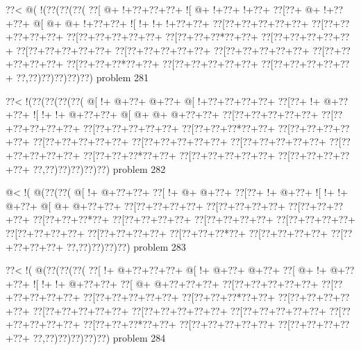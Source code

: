 \vbox{\vbox{\goo
\0??<\- @(\- !(\0??(\0??(\0??(
\0??[\- @+\- !+\0??+\0??+\0??+
\- ![\- @+\- !+\0??+\- !+\0??+
\0??[\0??+\- @+\- !+\0??+\0??+
\- @[\- @+\- @+\- !+\0??+\0??+
\- ![\- !+\- !+\- !+\0??+\0??+
\0??[\0??+\0??+\0??+\0??+\0??+
\0??[\0??+\0??+\0??+\0??+\0??+
\0??[\0??+\0??+\0??+\0??+\0??+
\0??[\0??+\0??+\0??*\0??+\0??+
\0??[\0??+\0??+\0??+\0??+\0??+
\0??[\0??+\0??+\0??+\0??+\0??+
\0??[\0??+\0??+\0??+\0??+\0??+
\0??[\0??+\0??+\0??+\0??+\0??+
\0??[\0??+\0??+\0??+\0??+\0??+
\0??[\0??+\0??+\0??*\0??+\0??+
\0??[\0??+\0??+\0??+\0??+\0??+
\0??[\0??+\0??+\0??+\0??+\0??+
\0??,\0??)\0??)\0??)\0??)\0??)
}
\hfil problem 281\hfil\break
}

\vbox{\vbox{\goo
\0??<\- !(\0??(\0??(\0??(\0??(
\- @[\- !+\- @+\0??+\- @+\0??+
\- @[\- !+\0??+\0??+\0??+\0??+
\0??[\0??+\- !+\- @+\0??+\0??+
\- ![\- !+\- !+\- @+\0??+\0??+
\- @[\- @+\- @+\- @+\0??+\0??+
\0??[\0??+\0??+\0??+\0??+\0??+
\0??[\0??+\0??+\0??+\0??+\0??+
\0??[\0??+\0??+\0??+\0??+\0??+
\0??[\0??+\0??+\0??*\0??+\0??+
\0??[\0??+\0??+\0??+\0??+\0??+
\0??[\0??+\0??+\0??+\0??+\0??+
\0??[\0??+\0??+\0??+\0??+\0??+
\0??[\0??+\0??+\0??+\0??+\0??+
\0??[\0??+\0??+\0??+\0??+\0??+
\0??[\0??+\0??+\0??*\0??+\0??+
\0??[\0??+\0??+\0??+\0??+\0??+
\0??[\0??+\0??+\0??+\0??+\0??+
\0??,\0??)\0??)\0??)\0??)\0??)
}
\hfil problem 282\hfil\break
}

\vbox{\vbox{\goo
\- @<\- !(\- @(\0??(\0??(
\- @[\- !+\- @+\0??+\0??+
\0??[\- !+\- @+\- @+\0??+
\0??[\0??+\- !+\- @+\0??+
\- ![\- !+\- !+\- @+\0??+
\- @[\- @+\- @+\0??+\0??+
\0??[\0??+\0??+\0??+\0??+
\0??[\0??+\0??+\0??+\0??+
\0??[\0??+\0??+\0??+\0??+
\0??[\0??+\0??+\0??*\0??+
\0??[\0??+\0??+\0??+\0??+
\0??[\0??+\0??+\0??+\0??+
\0??[\0??+\0??+\0??+\0??+
\0??[\0??+\0??+\0??+\0??+
\0??[\0??+\0??+\0??+\0??+
\0??[\0??+\0??+\0??*\0??+
\0??[\0??+\0??+\0??+\0??+
\0??[\0??+\0??+\0??+\0??+
\0??,\0??)\0??)\0??)\0??)
}
\hfil problem 283\hfil\break
}

\vbox{\vbox{\goo
\0??<\- !(\- @(\0??(\0??(\0??(
\0??[\- !+\- @+\0??+\0??+\0??+
\- @[\- !+\- @+\0??+\- @+\0??+
\0??[\- @+\- !+\- @+\0??+\0??+
\- ![\- !+\- !+\- @+\0??+\0??+
\0??[\- @+\- @+\0??+\0??+\0??+
\0??[\0??+\0??+\0??+\0??+\0??+
\0??[\0??+\0??+\0??+\0??+\0??+
\0??[\0??+\0??+\0??+\0??+\0??+
\0??[\0??+\0??+\0??*\0??+\0??+
\0??[\0??+\0??+\0??+\0??+\0??+
\0??[\0??+\0??+\0??+\0??+\0??+
\0??[\0??+\0??+\0??+\0??+\0??+
\0??[\0??+\0??+\0??+\0??+\0??+
\0??[\0??+\0??+\0??+\0??+\0??+
\0??[\0??+\0??+\0??*\0??+\0??+
\0??[\0??+\0??+\0??+\0??+\0??+
\0??[\0??+\0??+\0??+\0??+\0??+
\0??,\0??)\0??)\0??)\0??)\0??)
}
\hfil problem 284\hfil\break
}

